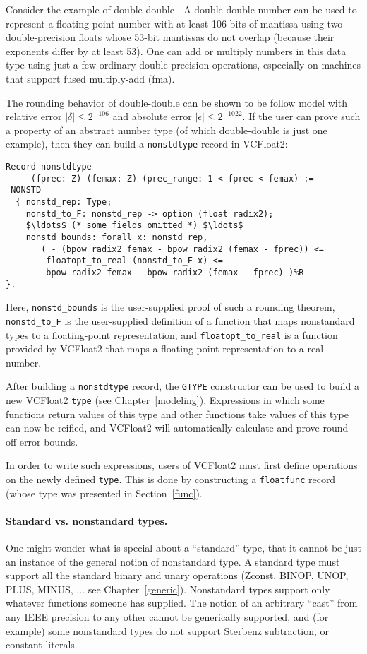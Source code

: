 \documentclass[article]{memoir}
\begin{document}
Consider the example of double-double \cite{dekker71}.  A
double-double number can be used to represent a
floating-point number with at least 106 bits
of mantissa using two double-precision floats whose 53-bit mantissas
do not overlap (because their exponents differ by at least 53). One can add or multiply 
numbers in this data type using just
a few ordinary double-precision operations, especially on machines
that support fused multiply-add (fma).

The rounding behavior of double-double can be shown to be
follow model with relative error $|\delta| \le 2^{-106}$ and
absolute error $|\epsilon| \le 2^{-1022}$.
If the user can prove such a property of an abstract number
type (of which double-double is just one example), then they
can build a \lstinline{nonstdtype} record in VCFloat2:

\begin{lstlisting}
Record nonstdtype 
     (fprec: Z) (femax: Z) (prec_range: 1 < fprec < femax) := 
 NONSTD 
  { nonstd_rep: Type;
    nonstd_to_F: nonstd_rep -> option (float radix2);
    $\ldots$ (* some fields omitted *) $\ldots$
    nonstd_bounds: forall x: nonstd_rep, 
       ( - (bpow radix2 femax - bpow radix2 (femax - fprec)) <=
        floatopt_to_real (nonstd_to_F x) <=
        bpow radix2 femax - bpow radix2 (femax - fprec) )%R
}.
\end{lstlisting}
Here, \lstinline{nonstd_bounds} is the user-supplied proof 
of such a rounding theorem, \lstinline{nonstd_to_F}
is the user-supplied definition of a function that maps 
nonstandard types to a floating-point representation, and
\lstinline{floatopt_to_real} is a function provided by
VCFloat2 that maps  a floating-point representation to a real number. 

After building a \lstinline{nonstdtype} record, the 
 \lstinline{GTYPE} constructor can be used to build a new 
VCFloat2 \lstinline{type}  (see Chapter~\ref{modeling}).
Expressions in which some functions return
values of this type and other functions take values of this type
can now be reified, and VCFloat2 will automatically calculate
and prove round-off error bounds.

In order to write such expressions, users of VCFloat2 must first
define operations on the newly defined \lstinline{type}. This
is done by constructing a \lstinline{floatfunc} record
(whose type was presented in Section~\ref{func}).

\paragraph{Standard vs. nonstandard types.}  One might wonder what is
special about a ``standard'' type, that it cannot be just an instance
of the general notion of nonstandard type.  
A standard type must support all the standard binary and unary operations
(Zconst, BINOP, UNOP, PLUS, MINUS, $\ldots$ see Chapter~\ref{generic}).
Nonstandard types support only whatever functions
someone has supplied.  The notion of an arbitrary ``cast'' from
any IEEE precision to any other cannot be generically supported,
and (for example) some nonstandard types do not support Sterbenz
subtraction, or constant literals.
\end{document}
